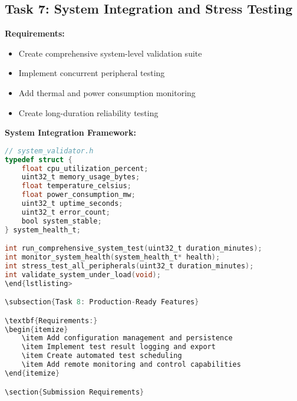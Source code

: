 \documentclass[11pt,a4paper]{article}
\begin{document}
\subsection{Task 7: System Integration and Stress Testing}

\textbf{Requirements:}
\begin{itemize}
    \item Create comprehensive system-level validation suite
    \item Implement concurrent peripheral testing
    \item Add thermal and power consumption monitoring
    \item Create long-duration reliability testing
\end{itemize}

\textbf{System Integration Framework:}
\begin{lstlisting}[language=C]
// system_validator.h
typedef struct {
    float cpu_utilization_percent;
    uint32_t memory_usage_bytes;
    float temperature_celsius;
    float power_consumption_mw;
    uint32_t uptime_seconds;
    uint32_t error_count;
    bool system_stable;
} system_health_t;

int run_comprehensive_system_test(uint32_t duration_minutes);
int monitor_system_health(system_health_t* health);
int stress_test_all_peripherals(uint32_t duration_minutes);
int validate_system_under_load(void);
\end{lstlisting>

\subsection{Task 8: Production-Ready Features}

\textbf{Requirements:}
\begin{itemize}
    \item Add configuration management and persistence
    \item Implement test result logging and export
    \item Create automated test scheduling
    \item Add remote monitoring and control capabilities
\end{itemize}

\section{Submission Requirements}


\end{lstlisting}
\end{document}
